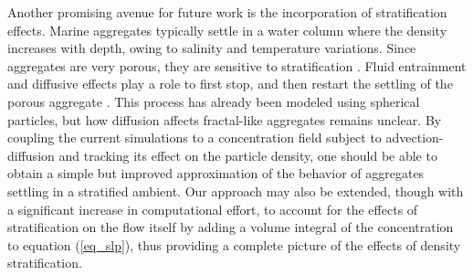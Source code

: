 Another promising avenue for future work is the incorporation of stratification effects. Marine aggregates typically settle in a water column where the density increases with depth, owing to salinity and temperature variations. Since aggregates are very porous, they are sensitive to stratification \cite{prairie_delayed_2013}. 
Fluid entrainment and diffusive effects play a role to first stop, and then restart the settling of the porous aggregate
\cite{panah_simulations_2017}. This process has already been modeled using spherical particles, but how diffusion affects fractal-like aggregates remains unclear. By coupling the current simulations to a concentration field subject to advection-diffusion and tracking its effect on the particle density, one should be able to obtain a simple but improved approximation of the behavior of aggregates settling in a stratified ambient. Our approach may also be extended, though with a significant increase in computational effort, to account for the effects of stratification on the flow itself by adding a volume integral of the concentration to equation (\ref{eq_slp}), thus providing a complete picture of the effects of density stratification.

